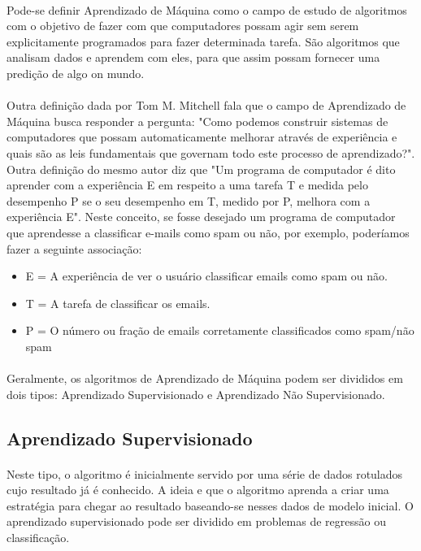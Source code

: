 \documentclass[grad,numbers]{coppe}
\begin{document}
  	\paragraph{}Pode-se definir Aprendizado de Máquina como o campo de estudo de algoritmos com o objetivo de fazer com que computadores possam agir sem serem explicitamente programados para fazer determinada tarefa. São algoritmos que analisam dados e aprendem com eles, para que assim possam fornecer uma predição de algo on mundo.
  	\paragraph{}Outra definição dada por Tom M. Mitchell\cite{ml-mitchell} fala que o campo de Aprendizado de Máquina busca responder a pergunta: "Como podemos construir sistemas de computadores que possam automaticamente melhorar através de experiência e quais são as leis fundamentais que governam todo este processo de aprendizado?". Outra definição do mesmo autor\cite{ml-mitchell-book} diz que "Um programa de computador é dito aprender com a experiência E em respeito a uma tarefa T e medida pelo desempenho P se o seu desempenho em T, medido por P, melhora com a experiência E". Neste conceito, se fosse desejado um programa de computador que aprendesse a classificar e-mails como spam ou não, por exemplo, poderíamos fazer a seguinte associação:
  	\begin{itemize}
  		\item E = A experiência de ver o usuário classificar emails como spam ou não.
			\item T = A tarefa de classificar os emails.
			\item P = O número ou fração de emails corretamente classificados como spam/não spam
  	\end{itemize}
  	\paragraph{}Geralmente, os algoritmos de Aprendizado de Máquina podem ser divididos em dois tipos: Aprendizado Supervisionado e Aprendizado Não Supervisionado.
  	\subsection{Aprendizado Supervisionado}
  		\paragraph{}Neste tipo, o algoritmo é inicialmente servido por uma série de dados rotulados cujo resultado já é conhecido. A ideia e que o algoritmo aprenda a criar uma estratégia para chegar ao resultado baseando-se nesses dados de modelo inicial. O aprendizado supervisionado pode ser dividido em problemas de regressão ou classificação.
\end{document}
